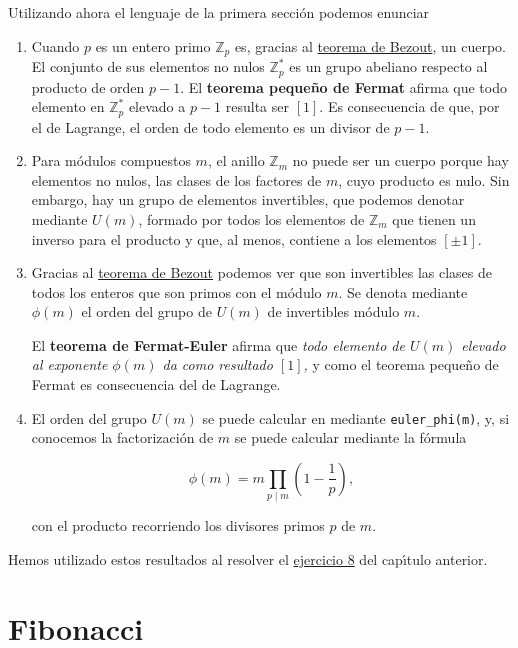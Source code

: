 \label{orden}
Utilizando ahora el lenguaje de la primera secci\'on podemos enunciar

\begin{enumerate}
	\item Cuando $p$ es un entero primo $\mathbb{Z}_p$ es, gracias al  \hyperref[bezout]{teorema de Bezout}, un cuerpo. El conjunto de sus elementos no nulos $\mathbb{Z}_p^*$ es un grupo abeliano respecto al producto de orden $p-1$. El {\bf teorema peque\~no de Fermat} afirma que  todo elemento en $\mathbb{Z}_p^*$ elevado a $p-1$ resulta ser $[1]$. Es consecuencia de que, por el de Lagrange,  el orden de todo elemento es un divisor de $p-1$. 
	
	\item Para m\'odulos compuestos $m$, el anillo $\mathbb{Z}_m$ no puede ser un cuerpo porque hay elementos no nulos, las clases de los factores de $m$, cuyo producto es nulo. Sin embargo, hay un grupo de elementos invertibles, que podemos denotar mediante $U(m)$, formado por todos los elementos de $\mathbb{Z}_m$ que tienen un inverso para el producto y que, al menos, contiene a los elementos $[\pm 1]$. 
	
	\item Gracias al  \hyperref[bezout]{teorema de Bezout} podemos ver que son invertibles las clases de todos los enteros que son primos con el m\'odulo $m$. Se denota mediante $\phi(m)$ el orden del grupo de $U(m)$ de invertibles m\'odulo $m$. 
	
	El {\bf teorema de Fermat-Euler} afirma que {\itshape  todo elemento de $U(m)$ elevado al exponente $\phi(m)$ da como resultado $[1]$,} y como el teorema peque\~no de Fermat es consecuencia del de Lagrange.
	
	\item El orden del grupo $U(m)$ se puede calcular en {\sage} mediante \lstinline|euler_phi(m)|, y, si conocemos la factorizaci\'on de $m$ se puede calcular mediante la f\'ormula
	
	\[\phi(m)=m\prod_{p\mid m}\left(1-\frac{1}{p} \right), \]
	
	\noindent con el producto recorriendo los divisores primos $p$ de $m.$ 
	
\end{enumerate}


Hemos utilizado estos resultados al resolver el  \hyperref[pr-ej8]{ejercicio 8} del cap\'{\i}tulo anterior.





\section{Fibonacci}\label{fibon}

